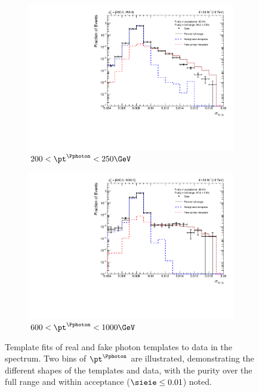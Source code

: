 \begin{figure}[htbp]
    \centering
    \begin{subfigure}[b]{0.45\textwidth}
        \includegraphics[width=\textwidth]{figures/photon_purity/2017/fit_200.0_to_250.0.pdf}
        \caption{$\text{200} < \pt^{\Pphoton} < \text{250\GeV}$}
    \end{subfigure}
    \hfill
    \begin{subfigure}[b]{0.45\textwidth}
        \includegraphics[width=\textwidth]{figures/photon_purity/2017/fit_600.0_to_1000.0.pdf}
        \caption{$\text{600} < \pt^{\Pphoton} < \text{1000\GeV}$}
    \end{subfigure}
    \caption[Template fits of real and fake photon templates to data in the \sieie spectrum]{Template fits of real and fake photon templates to data in the \sieie spectrum. Two bins of $\pt^{\Pphoton}$ are illustrated, demonstrating the different shapes of the templates and data, with the purity over the full range and within acceptance ($\sieie \leq \text{0.01}$) noted.}
    \label{fig:htoinv_photon_purity_fits}
\end{figure}

